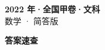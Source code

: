 \documentclass[zihao=-4, a4paper]{ctexart}
\begin{document}
\begin{center}
  {\Large\bfseries 2022 年·全国甲卷·文科}\\[4pt]
  {\large 数学 · 简答版}
\end{center}
\medskip
{}

\clearpage
{}
\begin{center}{\Large\bfseries 答案速查}\end{center}
\medskip

\end{document}
